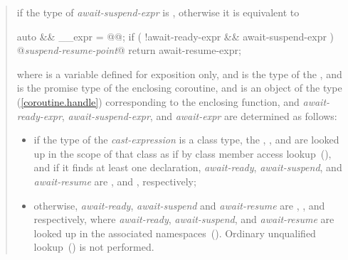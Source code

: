\begin{quote}







if the type of \textit{await-suspend-expr} is , otherwise it is equivalent to

\begin{codeblock}
{
  auto && __expr = @@;
  if ( !await-ready-expr && await-suspend-expr ) {
    @\textit{suspend-resume-point}@
  }
  return await-resume-expr;
}
\end{codeblock}

where  is a variable defined for
exposition only, and  is the type of the
, and  is the 
promise type of the enclosing coroutine,
and 
is an object of the type  (\ref{coroutine.handle}) corresponding to the enclosing function,
and \textit{await-ready-expr}, \textit{await-suspend-expr}, and \textit{await-expr} are
determined as follows:


\begin{itemize}
	\item if the type of the \textit{cast-expression} is a class type, the 
	, , and  are 
	looked up in the scope of that class
	as if by class member access lookup~(), and if it finds at least one declaration, 
	\textit{await-ready}, \textit{await-suspend}, and \textit{await-resume} are
	,  and ,
	respectively;
	
	\item otherwise, \textit{await-ready}, \textit{await-suspend} and \textit{await-resume} are 
	, , and  
	respectively, where 
	\textit{await-ready}, \textit{await-suspend}, and \textit{await-resume} are 
	looked up in the associated namespaces~().
	\enternote Ordinary unqualified lookup~() is not
	performed. \exitnote
\end{itemize}


\end{quote}
